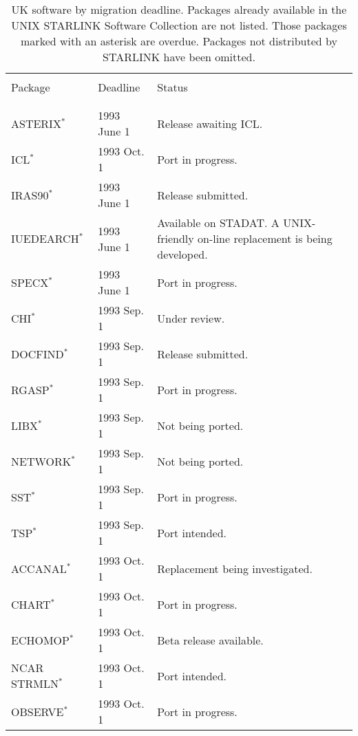\begin{table}
\begin{center}
\caption{UK software by migration deadline.
Packages already available in the UNIX STARLINK Software Collection
are not listed.
Those packages marked with an asterisk are overdue.
Packages not distributed by STARLINK have been omitted.}
\vspace{5mm}
\begin{tabular}{|p{36mm}|p{30mm}|p{60mm}|} \hline \label{t_UKdead}
& & \\
Package & Deadline & Status \\
& & \\ \hline
& & \\
ASTERIX$^{\ast}$                & 1993 June 1  & Release awaiting ICL. \\
ICL$^{\ast}$                    & 1993 Oct. 1  & Port in progress. \\
IRAS90$^{\ast}$                 & 1993 June 1  & Release submitted. \\
IUEDEARCH$^{\ast}$              & 1993 June 1  & Available on STADAT. A
   UNIX-friendly on-line replacement is being developed.\\
SPECX$^{\ast}$                  & 1993 June 1  & Port in progress. \\
CHI$^{\ast}$                    & 1993 Sep. 1  & Under review. \\
DOCFIND$^{\ast}$                & 1993 Sep. 1  & Release submitted. \\
RGASP$^{\ast}$                  & 1993 Sep. 1  & Port in progress. \\
LIBX$^{\ast}$                   & 1993 Sep. 1  & Not being ported. \\
NETWORK$^{\ast}$                & 1993 Sep. 1  & Not being ported. \\
SST$^{\ast}$                    & 1993 Sep. 1  & Port in progress. \\
TSP$^{\ast}$                    & 1993 Sep. 1  & Port intended. \\
ACCANAL$^{\ast}$                & 1993 Oct. 1  & Replacement being
   investigated. \\
CHART$^{\ast}$                  & 1993 Oct. 1  & Port in progress. \\
ECHOMOP$^{\ast}$                & 1993 Oct. 1  & Beta release available. \\
NCAR STRMLN$^{\ast}$            & 1993 Oct. 1  & Port intended. \\
OBSERVE$^{\ast}$                & 1993 Oct. 1  & Port in progress. \\

\end{tabular}
\end{center}
\end{table}
